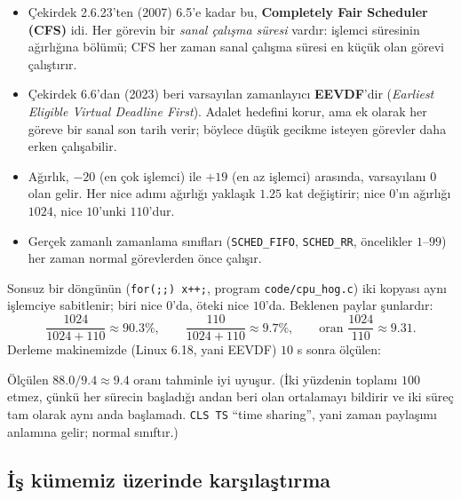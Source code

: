 \begin{itemize}
  \item Çekirdek 2.6.23'ten (2007) 6.5'e kadar bu, \textbf{Completely Fair Scheduler (CFS)} idi. Her görevin bir \emph{sanal çalışma süresi} vardır: işlemci süresinin ağırlığına bölümü; CFS her zaman sanal çalışma süresi en küçük olan görevi çalıştırır.
  \item Çekirdek 6.6'dan (2023) beri varsayılan zamanlayıcı \textbf{EEVDF}'dir (\emph{Earliest Eligible Virtual Deadline First}). Adalet hedefini korur, ama ek olarak her göreve bir sanal son tarih verir; böylece düşük gecikme isteyen görevler daha erken çalışabilir.
  \item Ağırlık, $-20$ (en çok işlemci) ile $+19$ (en az işlemci) arasında, varsayılanı $0$ olan  gelir. Her nice adımı ağırlığı yaklaşık $1.25$ kat değiştirir; nice $0$'ın ağırlığı $1024$, nice $10$'unki $110$'dur.
  \item Gerçek zamanlı zamanlama sınıfları (\texttt{SCHED\_FIFO}, \texttt{SCHED\_RR}, öncelikler $1$--$99$) her zaman normal görevlerden önce çalışır.
\end{itemize}

\begin{example}
Sonsuz bir döngünün (\texttt{for(;;) x++;}, program \texttt{code/cpu\_hog.c}) iki kopyası aynı işlemciye sabitlenir; biri nice $0$'da, öteki nice $10$'da. Beklenen paylar şunlardır:
\[
\frac{1024}{1024+110} \approx 90.3\%, \qquad \frac{110}{1024+110} \approx 9.7\%, \qquad \text{oran } \frac{1024}{110} \approx 9.31 .
\]
Derleme makinemizde (Linux 6.18, yani EEVDF) $10$ s sonra ölçülen:

Ölçülen $88.0/9.4 \approx 9.4$ oranı tahminle iyi uyuşur. (İki yüzdenin toplamı $100$ etmez, çünkü  her sürecin başladığı andan beri olan ortalamayı bildirir ve iki süreç tam olarak aynı anda başlamadı. \texttt{CLS TS} ``time sharing'', yani zaman paylaşımı anlamına gelir; normal sınıftır.)
\end{example}

\subsection{İş kümemiz üzerinde karşılaştırma}

